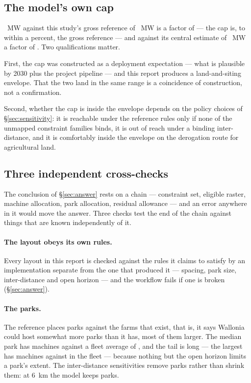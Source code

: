 \documentclass[11pt,a4paper]{article}
\begin{document}
\subsection{The model's own cap}

\CapToday{}~MW against this study's gross reference of \PlacePnom{}~MW is a
factor of \CapRatio{} --- the cap is, to within a percent, the gross
reference --- and against its central estimate of \ResCentral{}~MW a factor of
\CapRatioCentral{}. Two qualifications matter.

First, the cap was constructed as a deployment expectation --- what is plausible
by 2030 plus the project pipeline --- and this report produces a land-and-siting
envelope. That the two land in the same range is a coincidence of construction,
not a confirmation.

Second, whether the cap is inside the envelope depends on the policy choices of
§\ref{sec:sensitivity}: it is reachable under the reference rules only if none
of the unmapped constraint families binds, it is out of reach under a binding
inter-distance, and it is comfortably inside the envelope on the derogation route
for agricultural land.

\subsection{Three independent cross-checks}\label{sec:crosschecks}

The conclusion of §\ref{sec:answer} rests on a chain --- constraint set,
eligible raster, machine allocation, park allocation, residual allowance ---
and an error anywhere in it would move the answer. Three checks test the end of
the chain against things that are known independently of it.

\paragraph{The layout obeys its own rules.} Every layout in this report is
checked against the rules it claims to satisfy by an implementation separate
from the one that produced it --- spacing, park size, inter-distance and open
horizon --- and the workflow fails if one is broken
(§\ref{sec:answer}).

\paragraph{The parks.} The reference places \PlaceParks{} parks against the
\FleetFarms{} farms that exist, that is, it says Wallonia could host somewhat
more parks than it has, most of them larger. The median park has
\PlaceMedianPark{} machines against a fleet average of \FleetPerFarm{}, and the
tail is long --- the largest has \PlaceLargestPark{} machines against
\FleetLargestFarm{} in the fleet --- because nothing but the open horizon limits
a park's extent. The inter-distance sensitivities remove parks rather than
shrink them: at 6~km the model keeps \IdSixParks{} parks.
\end{document}
